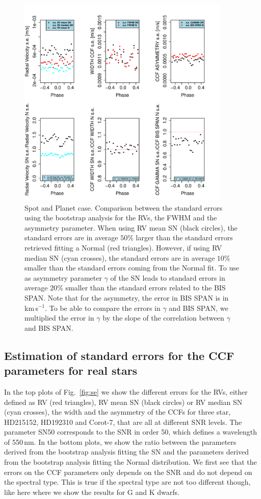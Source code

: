\documentclass[11pt, oneside]{article}
\def\kms{\hbox{\,km\,s$^{-1}$}}       %
\begin{document}
\begin{figure}[htbp]
   \centering
\includegraphics[height = 4in]{RV_comparison_SPOT_PLANET_standard_errors.pdf} 
   \caption{Spot and Planet case. Comparison between the standard errors using the bootstrap analysis for the RVs, the FWHM and the asymmetry parameter. When using RV mean SN (black circles), the standard errors are in average $50\%$ larger than the standard errors retrieved fitting a Normal (red triangles). However, if using RV median SN (cyan crosses), the standard errors are in average $10\%$ smaller than the standard errors coming from the Normal fit. To use as asymmetry parameter $\gamma$ of the SN leads to standard errors in average $20\%$ smaller than the standard errors related to the BIS SPAN. Note that for the asymmetry, the error in BIS SPAN is in \kms. To be able to compare the errors in $\gamma$ and BIS SPAN, we multiplied the error in $\gamma$ by the slope of the correlation between $\gamma$ and BIS SPAN.}
   \label{fig:se.soap.spot.planet}
\end{figure}

\subsection{Estimation of standard errors for the CCF parameters for real stars} \label{sec:bootstrap_real_star}
In the top plots of Fig.~\ref{fig:se} we show the different errors for the RVs, either defined as RV (red triangles), RV mean SN (black circles) or RV median SN (cyan crosses), the width and the asymmetry of the CCFs for three star, HD215152, HD192310 and Corot-7, that are all at different SNR levels. The parameter SN50 corresponds to the SNR in order 50, which defines a wavelength of 550\,nm. In the bottom plots, we show the ratio between the parameters derived from the bootstrap analysis fitting the SN and the parameters derived from the bootstrap analysis fitting the Normal distribution. We first see that the errors on the CCF parameters only depends on the SNR and do not depend on the spectral type. This is true if the spectral type are not too different though, like here where we show the results for G and K dwarfs.
\end{document}
